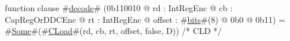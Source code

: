 function clause #\hyperref[sailMIPSzdecode]{decode}# (0b110010 @ rd : IntRegEnc @ cb : CapRegOrDDCEnc @ rt : IntRegEnc @ offset : #\hyperref[sailMIPSzbits]{bits}#(8) @ 0b0 @ 0b11) = #\hyperref[sailMIPSzSome]{Some}#(#\hyperref[sailMIPSzCLoad]{CLoad}#(rd, cb, rt, offset, false, D)) /* CLD */
